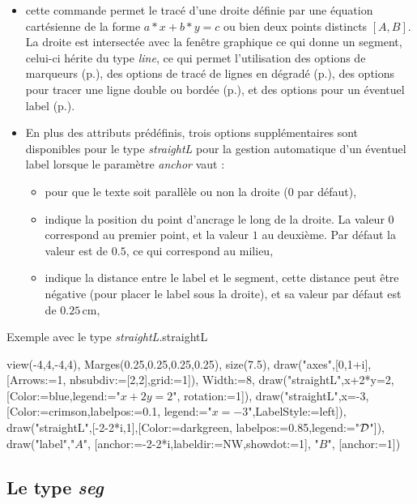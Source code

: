 \begin{itemize}
 \item \desc cette commande permet le tracé d'une droite définie par une équation cartésienne de la forme $a*x+b*y=c$ ou bien deux points distincts $[A,B]$. La droite est intersectée avec la fenêtre graphique ce qui donne un segment, celui-ci hérite du type \emph{line}, ce qui permet l'utilisation des options de marqueurs (p.\pageref{marqueurs}), des options de tracé de lignes en dégradé (p.\pageref{gradLines}), des options pour tracer une ligne double ou bordée (p.\pageref{optionsline}), et des options pour un éventuel label (p.\pageref{optionslabels}). 
 \item En plus des attributs prédéfinis, trois options supplémentaires sont disponibles pour le type \emph{straightL} pour la gestion automatique d'un éventuel label lorsque le paramètre \emph{anchor} vaut :\label{straightL}
  \begin{itemize}
   \item {} pour que le texte soit parallèle ou non la droite ($0$ par défaut),
   \item {} indique la position du point d'ancrage le long de la droite. La valeur $0$ correspond au premier point, et la valeur $1$ au deuxième. Par défaut la valeur est de $0.5$, ce qui correspond au milieu,
   \item {} indique la distance entre le label et le segment, cette distance peut être négative (pour placer le label sous la droite), et sa valeur par défaut est de $0.25$\,cm,
  \end{itemize}
\end{itemize}

\begin{demo}{Exemple avec le type \emph{straightL}.}{straightL}
\begin{texgraph}[name=straightL]
view(-4,4,-4,4), Marges(0.25,0.25,0.25,0.25), size(7.5),
draw("axes",[0,1+i],[Arrows:=1, nbsubdiv:=[2,2],grid:=1]),
Width:=8,
draw("straightL",x+2*y=2,[Color:=blue,legend:="$x+2y=2$",
 rotation:=1]),
draw("straightL",x=-3,[Color:=crimson,labelpos:=0.1,
 legend:="$x=-3$",LabelStyle:=left]),
draw("straightL",[-2-2*i,1],[Color:=darkgreen,
 labelpos:=0.85,legend:="$\cal D$"]),
draw("label","$A$", [anchor:=-2-2*i,labeldir:=NW,showdot:=1],
       "$B$", [anchor:=1])
\end{texgraph}
\end{demo}


\subsection{Le type \emph{seg}}

